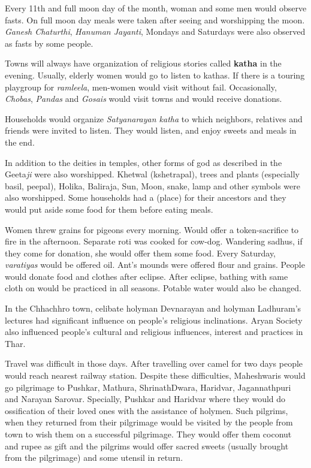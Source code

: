 Every 11th and full moon day of the month, woman and some men would observe
fasts. On full moon day meals were taken after seeing and worshipping the moon.
\textit{Ganesh Chaturthi}, \textit{Hanuman Jayanti}, Mondays and Saturdays were
also observed as fasts by some people.

Towns will always have organization of religious stories called \textbf{katha}
in the evening. Usually, elderly women would go to listen to kathas. If there
is a touring playgroup for \textit{ramleela}, men-women would visit without
fail. Occasionally, \textit{Chobas}, \textit{Pandas} and \textit{Gosais} would
visit towns and would receive donations.

Households would organize \textit{Satyanarayan katha} to which neighbors,
relatives and friends were invited to listen. They would listen, and enjoy
sweets and meals in the end.

In addition to the deities in temples, other forms of god as described in the
Geeta\textit{ji} were also worshipped. Khetwal (kshetrapal), trees and plants
(especially basil, peepal), Holika, Baliraja, Sun, Moon, snake, lamp and other
symbols were also worshipped. Some households had a  (place) for
their ancestors and they would put aside some food for them before eating
meals.

Women threw grains for pigeons every morning. Would offer a token-sacrifice to
fire in the afternoon. Separate roti was cooked for cow-dog. Wandering sadhus,
if they come for donation, she would offer them some food. Every Saturday,
\textit{varatiyas} would be offered oil. Ant's mounds were offered flour
and grains. People would donate food and clothes after eclipse. After
eclipse, bathing with same cloth on would be practiced in all seasons.
Potable water would also be changed.

In the Chhachhro town, celibate holyman Devnarayan and holyman Ladhuram's
lectures had significant influence on people's religious inclinations. Aryan
Society also influenced people's cultural and religious influences, interest
and practices in Thar.

Travel was difficult in those days. After travelling over camel for two days
people would reach nearest railway station. Despite these difficulties,
Maheshwaris would go pilgrimage to Pushkar, Mathura, ShrinathDwara, Haridvar,
Jagannathpuri and Narayan Sarovar. Specially, Pushkar and Haridvar where they
would do ossification of their loved ones with the assistance of holymen. Such
pilgrims, when they returned from their pilgrimage would be visited by the
people from town to wish them on a successful pilgrimage. They would offer them
coconut and rupee as gift and the pilgrims would offer sacred sweets (usually
brought from the pilgrimage) and some utensil in return.

